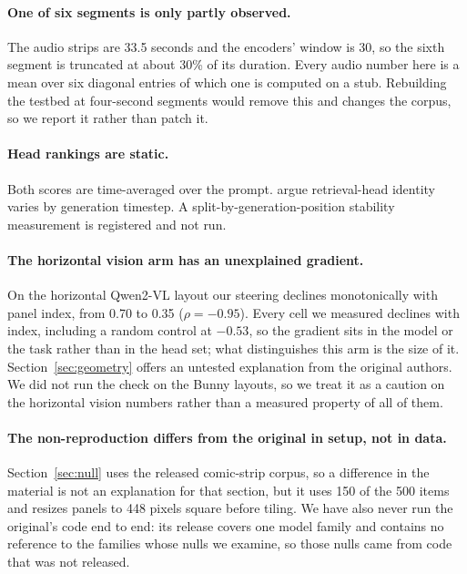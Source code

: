 \documentclass[11pt]{article}
\begin{document}
\paragraph{One of six segments is only partly observed.} The audio strips are
33.5 seconds and the encoders' window is 30, so the sixth segment is truncated at
about 30\% of its duration. Every audio number here is a mean over six diagonal
entries of which one is computed on a stub. Rebuilding the testbed at four-second
segments would remove this and changes the corpus, so we report it rather than
patch it.

\paragraph{Head rankings are static.} Both scores are time-averaged over the
prompt. \citet{dynamicheads2026} argue retrieval-head identity varies by
generation timestep. A split-by-generation-position stability measurement is
registered and not run.

\paragraph{The horizontal vision arm has an unexplained gradient.} On the
horizontal Qwen2-VL layout our steering declines monotonically with panel index,
from 0.70 to 0.35 ($\rho = -0.95$). Every cell we measured declines with index,
including a random control at $-0.53$, so the gradient sits in the model or the
task rather than in the head set; what distinguishes this arm is the size of it.
Section~\ref{sec:geometry} offers an untested explanation from the original
authors. We did not run the check on the Bunny layouts, so we treat it as a
caution on the horizontal vision numbers rather than a measured property of all
of them.

\paragraph{The non-reproduction differs from the original in setup, not in data.}
Section~\ref{sec:null} uses the released comic-strip corpus, so a difference in
the material is not an explanation for that section, but it uses 150 of the 500
items and resizes panels to 448 pixels square before tiling. We have also never run the original's
code end to end: its release covers one model family and contains no reference to
the families whose nulls we examine, so those nulls came from code that was not
released.
\end{document}
